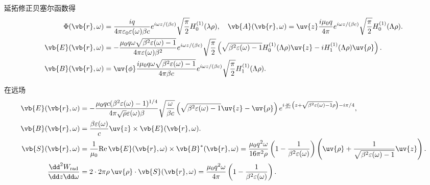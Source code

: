 \begin{exbox}
	延拓修正贝塞尔函数得
	\begin{align*}
		\Phi(\vb{r},\omega) &= \frac{i q}{4\pi \varepsilon_{0} \varepsilon(\omega) \beta c} e^{i\omega z/(\beta c)} \sqrt{\frac{\pi}{2}} H_{0}^{(1)}(\lambda \rho), \quad
		\vb{A}(\vb{r},\omega) = \uv{z} \frac{i \mu_{0} q}{4\pi} e^{i\omega z/(\beta c)} \sqrt{\frac{\pi}{2}} H_{0}^{(1)}(\Lambda \rho).\\
		\vb{E}(\vb{r},\omega) &= -\frac{\mu_{0} q \omega \sqrt{\beta^{2} \varepsilon(\omega) - 1}}{4\pi \varepsilon(\omega) \beta^{2}} e^{i\omega z/(\beta c)} \sqrt{\frac{\pi}{2}} \left( \sqrt{\beta^{2} \varepsilon(\omega) - 1} H_{0}^{(1)}(\Lambda \rho) \uv{z} - i H_{1}^{(1)}(\Lambda \rho) \uv{\rho} \right).\\
		\vb{B}(\vb{r},\omega) &= \uv{\phi} \frac{i \mu_{0} q \omega \sqrt{\beta^{2} \varepsilon(\omega) - 1}}{4\pi \beta c} e^{i\omega z/(\beta c)} \sqrt{\frac{\pi}{2}} H_{1}^{(1)}(\Lambda \rho).
	\end{align*}

	在远场
	\begin{align*}
		\vb{E}(\vb{r},\omega) &= -\frac{\mu_{0} q c (\beta^{2} \varepsilon(\omega) - 1)^{1/4}}{4\pi \sqrt{\rho} \varepsilon(\omega) \beta} \sqrt{\frac{\omega}{\beta c}} \left( \sqrt{\beta^{2} \varepsilon(\omega) - 1} \uv{z} - \uv{\rho} \right) e^{i\frac{\omega}{\beta c} \left( z + \sqrt{\beta^{2} \varepsilon(\omega) - 1} \rho \right) - i\pi/4}, \\
		\vb{B}(\vb{r},\omega) &= \frac{\beta \varepsilon(\omega)}{c} \uv{z} \times \vb{E}(\vb{r},\omega).\\
		\vb{S}(\vb{r},\omega) &= \frac{1}{\mu_{0}} \mathrm{Re} \, \vb{E}(\vb{r},\omega) \times \vb{B}^{*}(\vb{r},\omega) = \frac{\mu_{0} q^{2} \omega}{16\pi^{2} \rho} \left( 1 - \frac{1}{\beta^{2} \varepsilon(\omega)} \right) \left( \uv{\rho} + \frac{1}{\sqrt{\beta^{2} \varepsilon(\omega) - 1}} \uv{z} \right).\\
		\frac{\dd^{2} W_{\mathrm{rad}}}{\dd z \dd \omega} &= 2 \cdot 2\pi \rho \, \uv{\rho} \cdot \vb{S}(\vb{r},\omega) = \frac{\mu_{0} q^{2} \omega}{4\pi} \left( 1 - \frac{1}{\beta^{2} \varepsilon(\omega)} \right).
	\end{align*}


\end{exbox}
